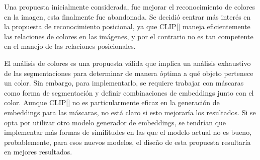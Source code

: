 Una propuesta inicialmente considerada, fue mejorar el reconocimiento de colores en la imagen, esta finalmente fue abandonada. Se decidió centrar más interés en la propuesta de reconocimiento posicional, ya que CLIP[\cite{clip}]  maneja eficientemente las relaciones de colores en las imágenes, y por el contrario no es tan competente en el manejo de las relaciones posicionales.

El análisis de colores es una propuesta válida que implica un análisis exhaustivo de las segmentaciones para determinar de manera óptima a qué objeto pertenece un color. Sin embargo, para implementarlo, se requiere trabajar con máscaras como forma de segmentación y definir combinaciones de embeddings junto con el color. Aunque CLIP[\cite{clip}]  no es particularmente eficaz en la generación de embeddings para las máscaras, no está claro si esto mejoraría los resultados. Si se opta por utilizar otro modelo generador de embeddings, se tendrían que implementar más formas de similitudes en las que el modelo actual no es bueno, probablemente, para esos nuevos modelos, el dise\~no de esta propuesta resultaría en mejores resultados.


